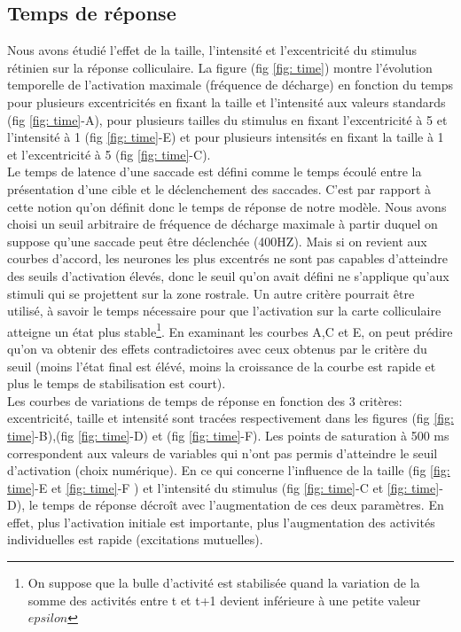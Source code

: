 \subsection{Temps de r\'eponse}

Nous avons étudié l'effet de la taille, l'intensité et l'excentricité du stimulus rétinien sur la réponse colliculaire. La figure (fig \ref{fig: time}) montre l'évolution temporelle de l'activation maximale (fréquence de décharge) en fonction du temps pour plusieurs excentricités en fixant la taille et l'intensité aux valeurs standards (fig \ref{fig: time}-A), pour plusieurs tailles du stimulus en fixant l'excentricité à 5 et l'intensité à 1 (fig \ref{fig: time}-E) et pour plusieurs intensités en fixant la taille à 1 et l'excentricité à 5 (fig \ref{fig: time}-C).\\

Le temps de latence d'une saccade est défini comme le temps écoulé entre la présentation d'une cible et le déclenchement des saccades. C'est par rapport à cette notion qu'on définit donc le temps de réponse de notre modèle. Nous avons choisi un seuil arbitraire de fréquence de décharge maximale à partir duquel on suppose qu'une saccade peut être déclenchée (400HZ).  Mais si on revient aux courbes d'accord, les neurones les plus excentrés ne sont pas capables d'atteindre des seuils d'activation élevés, donc le seuil qu'on avait défini ne s'applique qu'aux stimuli qui se projettent sur la zone rostrale. Un autre critère pourrait être utilisé, à savoir le temps nécessaire pour que l'activation sur la carte colliculaire atteigne un état plus stable\footnote{On suppose que la bulle d'activité est stabilisée quand la variation de la somme des activités entre t et t+1 devient inférieure à une petite valeur $epsilon$}. En examinant les courbes A,C et E, on peut prédire qu'on va obtenir des effets contradictoires avec ceux obtenus par le critère du seuil (moins l'état final est élévé, moins la croissance de la courbe est rapide et plus le temps de stabilisation est court).\\

Les courbes de variations de temps de réponse en fonction des 3 critères: excentricité, taille et intensité sont tracées respectivement dans les figures (fig \ref{fig: time}-B),(fig \ref{fig: time}-D) et (fig \ref{fig: time}-F). Les points de saturation à 500 ms correspondent aux valeurs de variables qui n'ont pas permis d'atteindre le seuil d'activation (choix numérique). En ce qui concerne l'influence de la taille (fig \ref{fig: time}-E et \ref{fig: time}-F ) et l'intensité du stimulus (fig \ref{fig: time}-C et \ref{fig: time}-D), le temps de réponse décroît avec l'augmentation de ces deux paramètres. En effet, plus l'activation initiale est importante, plus l'augmentation des activités individuelles est rapide (excitations mutuelles). \\

